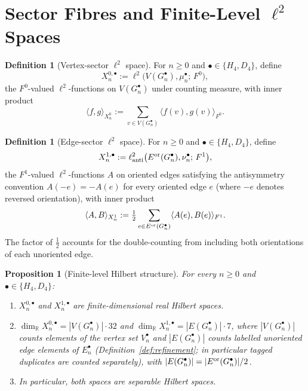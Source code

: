 \documentclass[11pt, a4paper]{amsart}
\newtheorem{proposition}[theorem]{Proposition}
\theoremstyle{definition}
\newtheorem{definition}[theorem]{Definition}
\newcommand{\R}{\mathbb{R}}
\begin{document}
\section{Sector Fibres and Finite-Level $\ell^2$ Spaces}
\label{sec:finite-level}

\begin{definition}[Vertex-sector $\ell^2$ space]
\label{def:Xn-0}
For $n \geq 0$ and $\bullet \in \{H_4, D_4\}$, define
\[
  X_n^{0, \bullet} := \ell^2\bigl(V(G_n^\bullet), \mu_n^\bullet;\,
    F^0\bigr),
\]
the $F^0$-valued $\ell^2$-functions on $V(G_n^\bullet)$ under
counting measure, with inner product
\[
  \langle f, g \rangle_{X_n^0} :=
    \sum_{v \in V(G_n^\bullet)} \langle f(v), g(v) \rangle_{F^0}.
\]
\end{definition}

\begin{definition}[Edge-sector $\ell^2$ space]
\label{def:Xn-1}
For $n \geq 0$ and $\bullet \in \{H_4, D_4\}$, define
\[
  X_n^{1, \bullet} := \ell^2_{\rm anti}\bigl(E^{\rm or}(G_n^\bullet),
    \nu_n^\bullet;\, F^1\bigr),
\]
the $F^1$-valued $\ell^2$-functions $A$ on oriented edges
satisfying the antisymmetry convention $A(-e) = -A(e)$ for every
oriented edge $e$ (where $-e$ denotes reversed orientation), with
inner product
\[
  \langle A, B \rangle_{X_n^1} := \tfrac{1}{2}
    \sum_{e \in E^{\rm or}(G_n^\bullet)} \langle A(e), B(e)
    \rangle_{F^1}.
\]
The factor of $\tfrac{1}{2}$ accounts for the double-counting from
including both orientations of each unoriented edge.
\end{definition}

\begin{proposition}[Finite-level Hilbert structure]
\label{prop:Xn-Hilbert}
For every $n \geq 0$ and $\bullet \in \{H_4, D_4\}$:
\begin{enumerate}
\item $X_n^{0, \bullet}$ and $X_n^{1, \bullet}$ are
  finite-dimensional real Hilbert spaces.
\item $\dim_\R X_n^{0, \bullet} = |V(G_n^\bullet)| \cdot 32$ and
  $\dim_\R X_n^{1, \bullet} = |E(G_n^\bullet)| \cdot 7$, where
  $|V(G_n^\bullet)|$ counts elements of the vertex set
  $V_n^\bullet$ and $|E(G_n^\bullet)|$ counts labelled
  unoriented edge elements of $E_n^\bullet$
  (Definition~\ref{def:refinement}; in particular tagged
  duplicates are counted separately), with
  $|E(G_n^\bullet)| = |E^{\rm or}(G_n^\bullet)|/2$.
\item In particular, both spaces are separable Hilbert spaces.
\end{enumerate}
\end{proposition}
\end{document}

